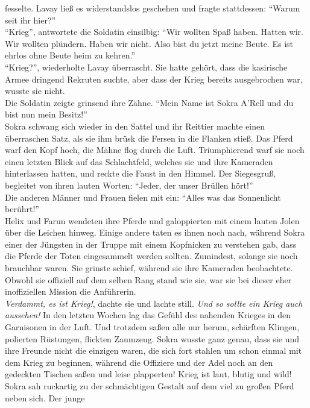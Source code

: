 fesselte. Lavay ließ es widerstandslos geschehen und fragte stattdessen: ``Warum seit ihr hier?''\\
``Krieg'', antwortete die Soldatin einsilbig: ``Wir wollten Spaß haben. Hatten wir. Wir wollten 
plündern. Haben wir nicht. Also bist du jetzt meine Beute. Es ist ehrlos ohne Beute heim zu 
kehren.''\\
``Krieg?'', wiederholte Lavay überrascht. Sie hatte gehört, dass die kasirische Armee dringend 
Rekruten suchte, aber dass der Krieg bereits ausgebrochen war, wusste sie nicht.\\
Die Soldatin zeigte grinsend ihre Zähne. ``Mein Name ist Sokra A'Rell und du bist nun mein 
Besitz!''\\

Sokra schwang sich wieder in den Sattel und ihr Reittier machte einen überraschen Satz, als sie ihm 
brüsk die Fersen in die Flanken stieß. Das Pferd warf den Kopf hoch, die Mähne flog durch die Luft. 
Triumphierend warf sie noch einen letzten Blick auf das Schlachtfeld, welches sie und ihre 
Kameraden hinterlassen hatten, und reckte die Faust in den Himmel. Der Siegesgruß, begleitet von 
ihren lauten Worten: ``Jeder, der unser Brüllen hört!''\\
Die anderen Männer und Frauen fielen mit ein: ``Alles was das Sonnenlicht berührt!''\\
Helix und Farun wendeten ihre Pferde und galoppierten mit einem lauten Jolen über die Leichen 
hinweg. Einige andere taten es ihnen noch nach, während Sokra einer der Jüngsten in der Truppe mit 
einem Kopfnicken zu verstehen gab, dass die Pferde der Toten eingesammelt werden sollten. 
Zumindest, solange sie noch brauchbar waren. Sie grinste schief, während sie ihre Kameraden 
beobachtete. Obwohl sie offiziell auf dem selben Rang stand wie sie, war sie bei dieser eher 
inoffiziellen Mission die Anführerin.\\
\textit{Verdammt, es ist Krieg!}, dachte sie und lachte still. \textit{Und so sollte ein Krieg auch 
aussehen!}
In den letzten Wochen lag das Gefühl des nahenden Krieges in den Garnisonen in der Luft. Und 
trotzdem saßen alle nur herum, schärften Klingen, polierten Rüstungen, flickten Zaumzeug. Sokra 
wusste ganz genau, dass sie und ihre Freunde nicht die einzigen waren, die sich fort stahlen um 
schon einmal mit dem Krieg zu beginnen, während die Offiziere und der Adel noch an den gedeckten 
Tischen saßen und leise plapperten! Krieg ist laut, blutig und wild!\\
Sokra sah ruckartig zu der schmächtigen Gestalt auf dem viel zu großen Pferd neben sich. Der junge 
